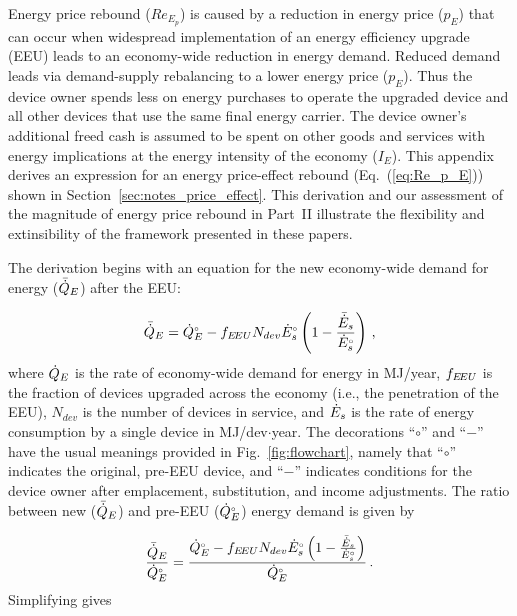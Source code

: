 

Energy price rebound ($Re_{E_p}$) is caused by a reduction 
in energy price ($p_E$)
that can occur when widespread implementation 
of an energy efficiency upgrade (EEU)
leads to an economy-wide reduction in energy demand.
Reduced demand leads via demand-supply rebalancing 
to a lower energy price ($p_E$).
Thus the device owner spends less on energy purchases
to operate the upgraded device
and all other devices that use the same final energy carrier.
The device owner's additional freed cash
is assumed to be spent on other goods and services
with energy implications 
at the energy intensity of the economy ($I_E$).
This appendix derives an expression for an
energy price-effect rebound (Eq.~(\ref{eq:Re_p_E}))
shown in Section~\ref{sec:notes_price_effect}.
This derivation and our assessment 
of the magnitude of energy price rebound
in Part~II
illustrate the flexibility and extinsibility of the framework
presented in these papers.

The derivation begins with an equation for the new economy-wide 
demand for energy ($\bar{\dot{Q}}_E$) after the EEU:

\begin{equation}
  \bar{\dot{Q}}_E = {}{\dot{Q}}^{\scriptscriptstyle \circ}_E - f_{E\!EU} N_{dev} {}{\dot{E}}^{\scriptscriptstyle \circ}_s \left( 1 - \frac{\bar{\dot{E}}_s}{{}{\dot{E}}^{\scriptscriptstyle \circ}_s} \right) \, ,
\end{equation}
%
where
$\dot{Q}_E$ is the rate of economy-wide demand for energy in MJ/year,
$f_{E\!EU}$ is the fraction of devices upgraded across the economy
(i.e., the penetration of the EEU),
$N_{dev}$ is the number of devices in service, and
$\dot{E}_s$ is the rate of energy consumption by a single device in MJ/dev$\cdot$year.
The decorations ``$\circ$'' and ``$-$'' have the usual meanings
provided in Fig.~\ref{fig:flowchart}, namely that
``$\circ$'' indicates the original, pre-EEU device, and
``$-$'' indicates conditions for the device owner after
emplacement, substitution, and income
adjustments.
The ratio between
new ($\bar{\dot{Q}}_E$) and
pre-EEU (${}{\dot{Q}}^{\scriptscriptstyle \circ}_E$)
energy demand is given by

\begin{equation}
  \frac{\bar{\dot{Q}}_E}{{}{\dot{Q}}^{\scriptscriptstyle \circ}_E} =
        \frac{{}{\dot{Q}}^{\scriptscriptstyle \circ}_E - f_{E\!EU} N_{dev} {}{\dot{E}}^{\scriptscriptstyle \circ}_s \left( 1 - \frac{\bar{\dot{E}}_s}{{}{\dot{E}}^{\scriptscriptstyle \circ}_s}  \right)}
        {{}{\dot{Q}}^{\scriptscriptstyle \circ}_E} \, .
\end{equation}
%
Simplifying gives

